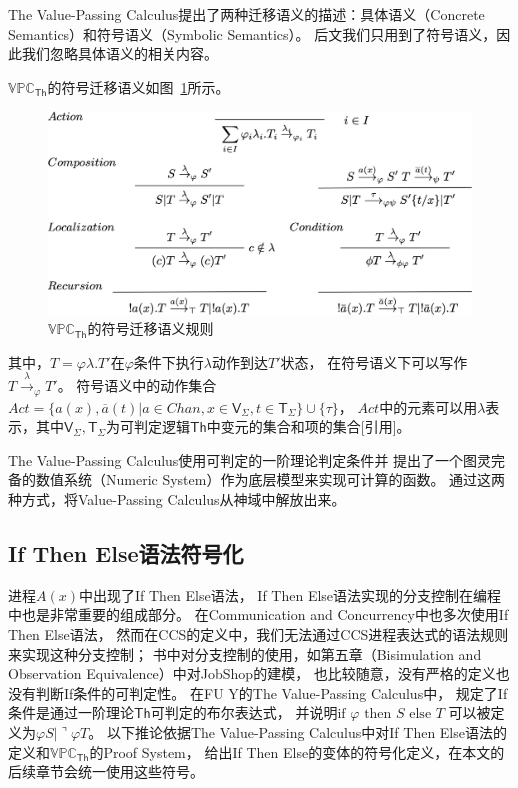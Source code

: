 The Value-Passing Calculus提出了两种迁移语义的描述：具体语义（Concrete Semantics）和符号语义（Symbolic Semantics）。
后文我们只用到了符号语义，因此我们忽略具体语义的相关内容。

$\mathbb{VPC}_{\mathsf{Th}}$的符号迁移语义如图~\ref{fig_vpc}所示。

\begin{figure}[!htbp]
   \small
   \centering
   \includegraphics[width=13cm]{../figures/vpc.png}
    \caption[]{$\mathbb{VPC}_{\mathsf{Th}}$的符号迁移语义规则}
    \label{fig_vpc}
\end{figure}
其中，$T=\varphi \lambda.T'$在$\varphi$条件下执行$\lambda$动作到达$T'$状态，
在符号语义下可以写作$T\stackrel{\lambda}{\rightarrow}_{\varphi}T'$。
符号语义中的动作集合$Act=\{a(x),\overline{a}(t)| a\in Chan, x\in \mathsf{V}_{\Sigma}, t\in \mathsf{T}_{\Sigma}\}\cup \{\tau\}$，
$Act$中的元素可以用$\lambda$表示，其中$\mathsf{V}_{\Sigma},\mathsf{T}_{\Sigma}$为可判定逻辑$\mathsf{Th}$中变元的集合和项的集合[引用]。

The Value-Passing Calculus使用可判定的一阶理论判定条件\cite{PA}并
提出了一个图灵完备的数值系统（Numeric System）\cite{Fu_VPC}作为底层模型来实现可计算的函数。
通过这两种方式，将Value-Passing Calculus从神域中解放出来。

\subsection{If Then Else语法符号化}
进程$A(x)$中出现了If Then Else语法，
If Then Else语法实现的分支控制在编程中也是非常重要的组成部分。
在Communication and Concurrency\cite{Milner_CCS}中也多次使用If Then Else语法，
然而在CCS的定义中，我们无法通过CCS进程表达式的语法规则来实现这种分支控制；
书中对分支控制的使用，如第五章（Bisimulation and Observation Equivalence）中对JobShop的建模，
也比较随意，没有严格的定义也没有判断If条件的可判定性。
在FU Y的The Value-Passing Calculus中，
规定了If条件是通过一阶理论$\mathsf{Th}$可判定的布尔表达式，
并说明$\textrm{if }\varphi\textrm{ then }S\textrm{ else }T$
可以被定义为$\varphi S|\urcorner \varphi T$。
以下推论依据The Value-Passing Calculus中对If Then Else语法的定义和$\mathbb{VPC}_{\mathsf{Th}}$的Proof System，
给出If Then Else的变体的符号化定义，在本文的后续章节会统一使用这些符号。

